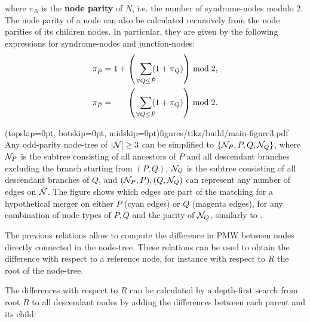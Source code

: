 where $\pi_N$ is the \textbf{node parity} of $N$, i.e. the number of syndrome-nodes modulo 2. The node parity of a node can also be calculated recursively from the node parities of its children nodes. In particular, they are given by the following expressions for syndrome-nodes and junction-nodes: 
\begin{align}
    \pi_{\dot{P}} &= 1+\left(\hspace{.2cm} \sum_{\mathclap{\forall Q \leq \dot{P}}} (1+\pi_Q) \right ) \bmod 2, \label{eq:snodeparity}\\
    \pi_{\bar{P}} &= \hspace{.6cm} \left(\hspace{.2cm} \sum_{\mathclap{\forall Q \leq \bar{P}}} (1+\pi_Q) \right) \bmod 2. \label{eq:jnodeparity}
\end{align}

\Figure[tb](topskip=0pt, botskip=0pt, midskip=0pt){figures/tikz/build/main-figure3.pdf}{
  Any odd-parity node-tree of $\lvert\dot{\mathcal{N}}\rvert\geq 3$ can be simplified to $\{\mathcal{N}_P,P,Q,\mathcal{N}_Q\}$, where $\mathcal{N}_P$ is the subtree consisting of all ancestors of $P$ and all descendant branches excluding the branch starting from $(P,Q)$, $\mathcal{N}_Q$ is the subtree consisting of all descendant branches of $Q$, and $(\mathcal{N}_P, P), (Q, \mathcal{N}_Q)$ can represent any number of edges on $\dot{\mathcal{N}}$. The figure shows which edges are part of the matching for a hypothetical merger on either $P$ (cyan edges) or $Q$ (magenta edges), for any combination of node types of $P,Q$ and the parity of $\mathcal{N}_Q$, similarly to .
  \label{fig:nmcombi}}

The previous relations allow to compute the difference in PMW between nodes directly connected in the node-tree. These relations can be used to obtain the difference with respect to a reference node, for instance with respect to $R$ the root of the node-tree.

The differences with respect to $R$ can be calculated by a depth-first search from root $R$ to all descendant nodes by adding the differences between each parent and its child:

